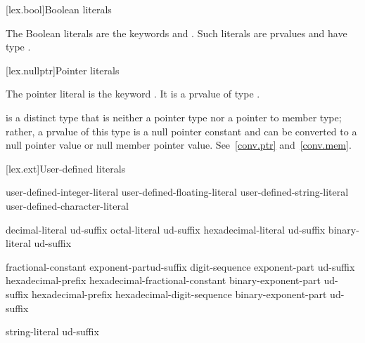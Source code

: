 [lex.bool]{Boolean literals}

%
\begin{bnf}
\br
    \br
\end{bnf}

\pnum
{}%
The Boolean literals are the keywords  and .
Such literals are prvalues and have type .

[lex.nullptr]{Pointer literals}

%
\begin{bnf}
\br
\end{bnf}

\pnum
The pointer literal is the keyword . It is a prvalue of type
.
\begin{note}
 is a distinct type that is neither a pointer type nor a pointer
to member type; rather, a prvalue of this type is a null pointer constant and can be
converted to a null pointer value or null member pointer value. See~\ref{conv.ptr}
and~\ref{conv.mem}.
\end{note}

[lex.ext]{User-defined literals}

%
\begin{bnf}
\br
    user-defined-integer-literal\br
    user-defined-floating-literal\br
    user-defined-string-literal\br
    user-defined-character-literal
\end{bnf}

\begin{bnf}
\br
    decimal-literal ud-suffix\br
    octal-literal ud-suffix\br
    hexadecimal-literal ud-suffix\br
    binary-literal ud-suffix
\end{bnf}

\begin{bnf}
\br
    fractional-constant exponent-part\opt ud-suffix\br
    digit-sequence exponent-part ud-suffix\br
    hexadecimal-prefix hexadecimal-fractional-constant binary-exponent-part ud-suffix\br
    hexadecimal-prefix hexadecimal-digit-sequence binary-exponent-part ud-suffix
\end{bnf}

\begin{bnf}
\br
    string-literal ud-suffix
\end{bnf}

